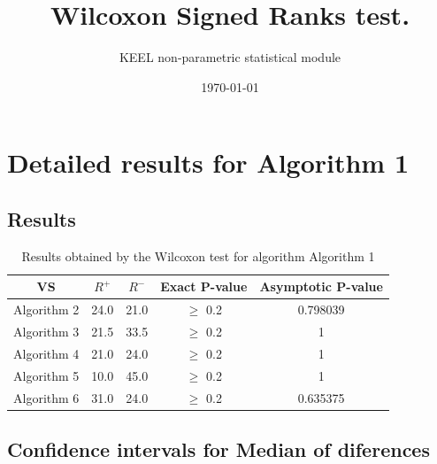 \documentclass[a4paper,10pt]{article}
\title{Wilcoxon Signed Ranks test.}
\date{\today}
\author{KEEL non-parametric statistical module}
\begin{document}
\pagestyle{empty}
\maketitle
\thispagestyle{empty}



\section{Detailed results for Algorithm 1}


\subsection{Results}

\begin{table}[!htp]
\centering\small
\begin{tabular}{
|c|c|c|c|c|}
\hline
 VS & $R^{+}$ & $R^{-}$ & Exact P-value & Asymptotic P-value \\ \hline 
Algorithm 2 & 24.0 & 21.0 & $\geq$ 0.2 & 0.798039\\ \hline 
Algorithm 3 & 21.5 & 33.5 & $\geq$ 0.2 & 1\\ \hline 
Algorithm 4 & 21.0 & 24.0 & $\geq$ 0.2 & 1\\ \hline 
Algorithm 5 & 10.0 & 45.0 & $\geq$ 0.2 & 1\\ \hline 
Algorithm 6 & 31.0 & 24.0 & $\geq$ 0.2 & 0.635375\\ \hline 

\end{tabular}
\caption{Results obtained by the Wilcoxon test for algorithm Algorithm 1}
\end{table}

\subsection{Confidence intervals for Median of diferences}
\end{document}
